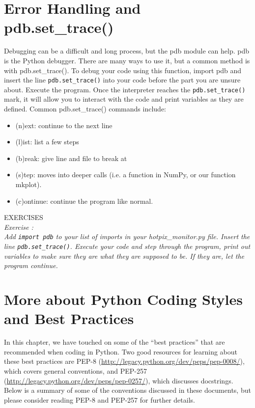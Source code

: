 \section{Error Handling and {\sf pdb.set\_trace()}}
Debugging can be a difficult and long process, but the {\sf\small pdb}
module can help.  {\sf\small pdb} is the Python debugger.  There are
many ways to use it, but a common method is with {\sf\small
  pdb.set\_trace()}.  To debug your code using this function, import
{\sf\small pdb} and insert the line \texttt{pdb.set\_trace()} into your
code before the part you are unsure about.  Execute the program.  Once
the interpreter reaches the \texttt{pdb.set\_trace()} mark, it will
allow you to interact with the code and print variables as they are
defined.   Common {\sf\small pdb.set\_trace()} commands include:
\begin{itemize}
\item (n)ext:    continue to the next line
\item (l)ist:      list a few steps
\item (b)reak:  give line and file to break at
\item (s)tep:    moves into deeper calls (i.e. a function in NumPy, or
  our function {\sf\small mkplot}).
\item (c)ontinue: continue the program like normal.
\end{itemize}

{\color{blue} {\sf\small EXERCISES}} \\
{\it Exercise  :  \\
  Add \texttt{import pdb} to your list of imports in your
  {\sf\small hotpix\_monitor.py file}.  Insert the line \texttt{pdb.set\_trace()}.
  Execute your code and step through the program, print out variables
  to make sure they are what they are supposed to be.  If they are, 
  let the program continue. }

\section{More about Python Coding Styles and Best Practices}
In this chapter, we have touched on some of the ``best practices'' that are
recommended when coding in Python.  Two good resources for learning about
these best practices are PEP-8 (\url {http://legacy.python.org/dev/peps/pep-0008/}),
which covers general conventions, and PEP-257 (\url {http://legacy.python.org/dev/peps/pep-0257/}),
which discusses docstrings.  Below is a summary of some of the conventions discussed in these 
documents, but please consider reading PEP-8 and PEP-257 for further details.


